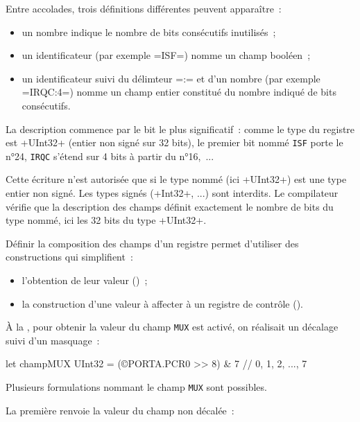 Entre accolades, trois définitions différentes peuvent apparaître~:
\begin{itemize}
\item un nombre indique le nombre de bits consécutifs inutilisés~;
\item un identificateur (par exemple \plm=ISF=) nomme un champ booléen~;
\item un identificateur suivi du délimteur \plm=:= et d'un nombre (par exemple \plm=IRQC:4=) nomme un champ entier constitué du nombre indiqué de bits consécutifs.
\end{itemize}

La description commence par le bit le plus significatif~: comme le type du registre est \plm+UInt32+ (entier non signé sur 32 bits), le premier bit nommé \texttt{ISF} porte le n°24, \texttt{IRQC} s'étend sur 4 bits à partir du n°16,~...

Cette écriture n'est autorisée que si le type nommé (ici \plm+UInt32+) est une type entier non signé. Les types signés (\plm+Int32+, ...) sont interdits. Le compilateur vérifie que la description des champs définit exactement le nombre de bits du type nommé, ici les 32 bits du type \plm+UInt32+.

Définir la composition des champs d'un registre permet d'utiliser des constructions qui simplifient~:
\begin{itemize}
  \item l'obtention de leur valeur ()~;
  \item la construction d'une valeur à affecter à un registre de contrôle ().
\end{itemize}











À la , pour obtenir la valeur du champ \texttt{MUX} est activé, on réalisait un décalage suivi d'un masquage~:
\begin{PLM}
let champMUX UInt32 = (©PORTA.PCR0 >> 8) & 7 // 0, 1, 2, ..., 7
\end{PLM}

Plusieurs formulations nommant le champ \texttt{MUX} sont possibles.

La première renvoie la valeur du champ non décalée~:

